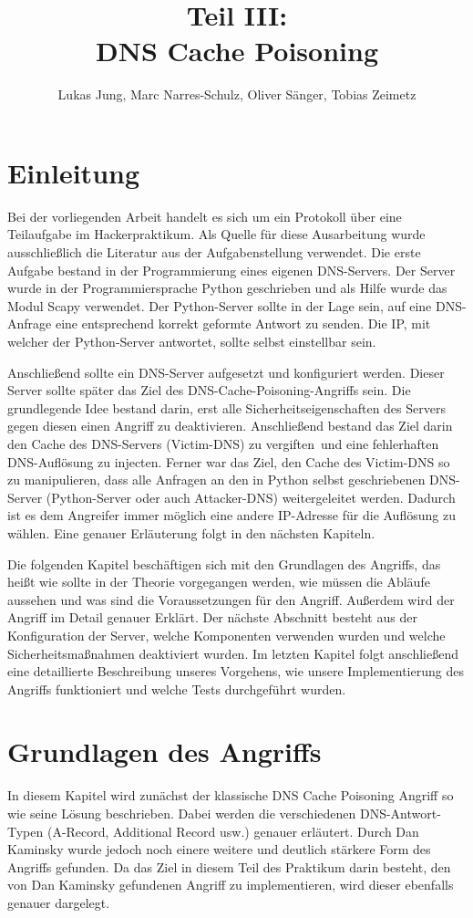 \documentclass[10pt,a4paper]{article}
\author{Lukas Jung, Marc Narres-Schulz, Oliver Sänger, Tobias Zeimetz}
\title{Teil III: \\DNS Cache Poisoning}
\begin{document}
\maketitle
\newpage

\section{Einleitung}
Bei der vorliegenden Arbeit handelt es sich um ein Protokoll über eine Teilaufgabe im \glqq Hackerpraktikum\grqq. Als Quelle für diese Ausarbeitung wurde ausschließlich die Literatur aus der Aufgabenstellung verwendet. Die erste Aufgabe bestand in der Programmierung eines eigenen DNS-Servers. Der Server wurde in der Programmiersprache Python geschrieben und als Hilfe wurde das Modul Scapy verwendet. Der Python-Server sollte in der Lage sein, auf eine DNS-Anfrage eine entsprechend korrekt geformte Antwort zu senden. Die IP, mit welcher der Python-Server antwortet, sollte selbst einstellbar sein.

Anschließend sollte ein DNS-Server aufgesetzt und konfiguriert werden. Dieser Server sollte später das Ziel des DNS-Cache-Poisoning-Angriffs sein. Die grundlegende Idee bestand darin, erst alle Sicherheitseigenschaften des Servers gegen diesen einen Angriff zu deaktivieren. Anschließend bestand das Ziel darin den Cache des DNS-Servers (Victim-DNS) zu \glqq vergiften\grqq \ und eine fehlerhaften DNS-Auflösung zu injecten. Ferner war das Ziel, den Cache des Victim-DNS so zu manipulieren, dass alle Anfragen an den in Python selbst geschriebenen DNS-Server (Python-Server oder auch Attacker-DNS) weitergeleitet werden. Dadurch ist es dem Angreifer immer möglich eine andere IP-Adresse für die Auflösung zu wählen. Eine genauer Erläuterung folgt in den nächsten Kapiteln.

Die folgenden Kapitel beschäftigen sich mit den Grundlagen des Angriffs, das heißt wie sollte in der Theorie vorgegangen werden, wie müssen die Abläufe aussehen und was sind die Voraussetzungen für den Angriff. Außerdem wird der Angriff im Detail genauer Erklärt. Der nächste Abschnitt besteht aus der Konfiguration der Server, welche Komponenten verwenden wurden und welche Sicherheitsmaßnahmen deaktiviert wurden. Im letzten Kapitel folgt anschließend eine detaillierte Beschreibung unseres Vorgehens, wie unsere Implementierung des Angriffs funktioniert und welche Tests durchgeführt wurden.

\section{Grundlagen des Angriffs}
In diesem Kapitel wird zunächst der klassische DNS Cache Poisoning Angriff so wie seine Lösung beschrieben. Dabei werden die verschiedenen DNS-Antwort-Typen (A-Record, Additional Record usw.) genauer erläutert. Durch Dan Kaminsky wurde jedoch noch einere weitere und deutlich stärkere Form des Angriffs gefunden. Da das Ziel in diesem Teil des Praktikum darin besteht, den von Dan Kaminsky gefundenen Angriff zu implementieren, wird dieser ebenfalls genauer dargelegt.
\end{document}
